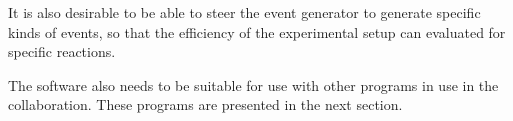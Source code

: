 It is also desirable to be able to steer the event generator to generate specific kinds of events, so that the efficiency of the experimental setup can evaluated for specific reactions.

The software also needs to be suitable for use with other programs in use in the \rtb{} collaboration. These programs are presented in the next section.
%
%
%
